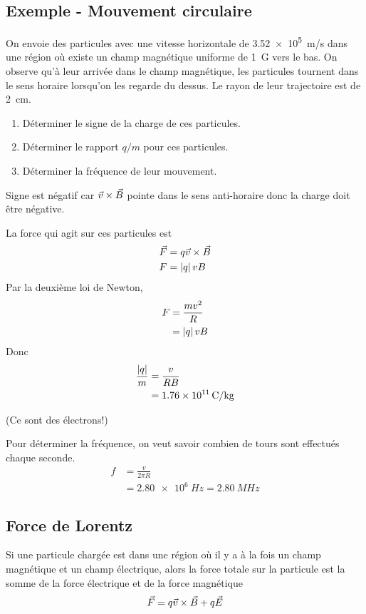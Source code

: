 \subsection*{Exemple - Mouvement circulaire}

On envoie des particules avec une vitesse horizontale de \SI{3.52e5}{m/s} dans
une région où existe un champ magnétique uniforme de \SI{1}{G} vers le bas. On
observe qu'à leur arrivée dans le champ magnétique, les particules tournent
dans le sens horaire lorsqu'on les regarde du dessus. Le rayon de leur
trajectoire est de \SI{2}{cm}.

\begin{enumerate}
  \item Déterminer le signe de la charge de ces particules.
  \item Déterminer le rapport $q/m$ pour ces particules.
  \item Déterminer la fréquence de leur mouvement.
\end{enumerate}


Signe est négatif car $\vec{v} \times \vec{B}$ pointe dans le sens anti-horaire donc la
charge doit être négative.

La force qui agit sur ces particules est
\begin{align*}
  \vec{F} &= q\vec{v} \times \vec{B} \\
  F &= \left| q \right| vB
\end{align*}
Par la deuxième loi de Newton,
\begin{align*}
  F &= \frac{mv^2}{R} \\ 
    &= \left| q \right| vB
\end{align*}
Donc
\begin{align*}
  \frac{\left| q \right|}{m} &= \frac{v}{RB} \\
  &= \SI{1.76e11}{C/kg}
\end{align*}

(Ce sont des électrons!)

Pour déterminer la fréquence, on veut savoir combien de tours sont effectués
chaque seconde.
\begin{align*}
  f &= \frac{v}{2\pi R} \\
    &= \SI{2.80e6}{Hz} = \SI{2.80}{MHz}
\end{align*}


\subsection*{Force de Lorentz}

Si une particule chargée est dans une région où il y a à la fois un champ
magnétique et un champ électrique, alors la force totale sur la particule est
la somme de la force électrique et de la force magnétique
$$\vec{F} = q\vec{v} \times \vec{B} + q \vec{E}$$



